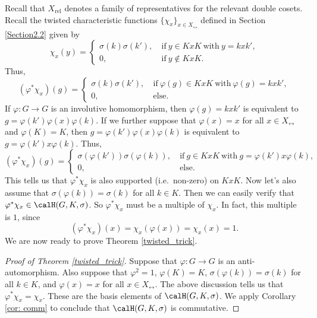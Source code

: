 \documentclass[11pt]{amsart}
\theoremstyle{remark}
\begin{document}
Recall that $X_\mathrm{rel}$ denotes a family of representatives for the relevant double cosets.
Recall the twisted characteristic functions $\{\chi_x\}_{x\in X_\rel}$ defined in Section \ref{Section2.2} given by
\[
	\chi_x(y) = \begin{cases}
		\sigma(k)\sigma(k'),\  & \text{if}\ y\in KxK\ \text{with}\ y=kxk', \\
		0,\                    & \text{if}\ y\notin KxK.
	\end{cases}
\]
Thus,
\[
	(\varphi^\ast\chi_x)(g) = \begin{cases}
		\sigma(k)\sigma(k'),\  & \text{if}\ \varphi(g) \in KxK\ \text{with}\ \varphi(g) = kxk', \\
		0,\                    & \text{else}.
	\end{cases}
\]
If $\varphi\colon G\to G$ is an involutive homomorphism, then $\varphi(g) = kxk'$ is equivalent to $g=\varphi(k')\varphi(x)\varphi(k)$.
If we further suppose that $\varphi(x)=x$ for all $x\in X_\rel$ and $\varphi(K)=K$, then $g=\varphi(k')\varphi(x)\varphi(k)$ is equivalent to $g=\varphi(k')x\varphi(k)$.
Thus,
\[
	(\varphi^\ast\chi_x)(g) = \begin{cases}
		\sigma(\varphi(k'))\sigma(\varphi(k)),\  & \text{if}\ g \in KxK\ \text{with}\ g = \varphi(k')x\varphi(k), \\
		0,\                                      & \text{else}.
	\end{cases}
\]
This tells us that $\varphi^\ast\chi_x$ is also supported (i.e.\ non-zero) on $KxK$.
Now let's also assume that $\sigma(\varphi(k))=\sigma(k)$ for all $k\in K$.
Then we can easily verify that $\varphi^\ast\chi_x \in \calH(G,K,\sigma)$.
So $\varphi^\ast\chi_x$ must be a multiple of $\chi_x$.
In fact, this multiple is $1$, since
\[
	(\varphi^\ast\chi_x)(x) = \chi_x(\varphi(x)) = \chi_x(x) = 1.
\]
We are now ready to prove Theorem \ref{twisted_trick}.
\begin{proof}[Proof of Theorem \ref{twisted_trick}]
	Suppose that $\varphi\colon G\to G$ is an anti-automorphism.
	Also suppose that $\varphi^2=1$, $\varphi(K)=K$, $\sigma(\varphi(k))=\sigma(k)$ for all $k\in K$, and $\varphi(x)=x$ for all $x\in X_\rel$.
	The above discussion tells us that $\varphi^\ast \chi_x = \chi_x$.
	These are the basis elements of $\calH(G,K,\sigma)$.
	We apply Corollary \ref{cor: comm} to conclude that $\calH(G,K,\sigma)$ is commutative.
\end{proof}

\end{document}
